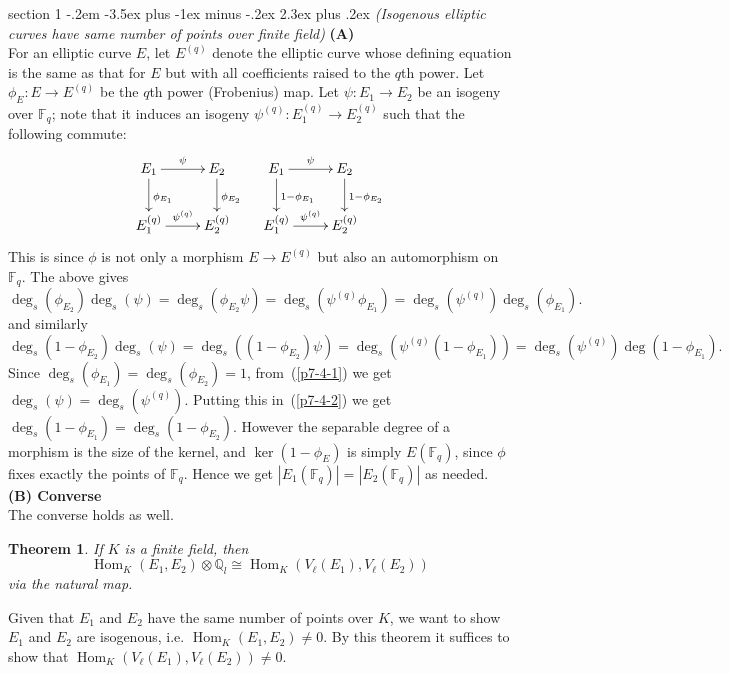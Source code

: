 \documentclass[12pt]{article}
\makeatletter
\theoremstyle{norm}
\newtheorem{thm}{Theorem}[section]
\newcommand{\F}[0]{\mathbb{F}}
\newcommand{\Q}[0]{\mathbb{Q}}
\newcommand{\subprob}[1]{\noindent\textbf{#1}\\}
\newcommand{\Hom}{\operatorname{Hom}}
\newenvironment{problem}{\@startsection
       {section}
       {1}
       {-.2em}
       {-3.5ex plus -1ex minus -.2ex}
       {2.3ex plus .2ex}
       {\pagebreak[3]%
       \large\bf\noindent{Problem }
       }
       }
       {%
       }
\makeatother
\begin{document}
\begin{problem}{\it (Isogenous elliptic curves have same number of points over finite field)}
\subprob{(A)}
For an elliptic curve $E$, let $E^{(q)}$ denote the elliptic curve whose defining equation is the same as that for $E$ but with all coefficients raised to the $q$th power. Let $\phi_E:E\to E^{(q)}$ be the $q$th power (Frobenius) map. Let $\psi:E_1\to E_2$ be an isogeny over $\F_q$; note that it induces an isogeny $\psi^{(q)}:E_1^{(q)}\to E_2^{(q)}$ such that the following commute:
\[
\xymatrix{
E_1\ar[r]^{\psi}\ar[d]^{\phi_{E_1}} &E_2\ar[d]^{\phi_{E_2}}\\
E_1^{(q)}\ar[r]^{\psi^{(q)}}&E_2^{(q)}
}\quad
\xymatrix{
E_1\ar[r]^{\psi}\ar[d]^{1-\phi_{E_1}} &E_2\ar[d]^{1-\phi_{E_2}}\\
E_1^{(q)}\ar[r]^{\psi^{(q)}}&E_2^{(q)}
}
\]
This is since %
$\phi$ is not only a morphism $E\to E^{(q)}$ but also an automorphism on $\F_q$. The above gives
\begin{equation}\label{p7-4-1}
\deg_s(\phi_{E_2})\deg_s(\psi)=\deg_s(\phi_{E_2}\psi)
=\deg_s(\psi^{(q)}\phi_{E_1})=\deg_s(\psi^{(q)})\deg_s(\phi_{E_1}).
\end{equation}
and similarly
\begin{equation}\label{p7-4-2}
\deg_s(1-\phi_{E_2})\deg_s(\psi)=\deg_s((1-\phi_{E_2})\psi)
=\deg_s(\psi^{(q)}(1-\phi_{E_1}))=\deg_s(\psi^{(q)})\deg(1-\phi_{E_1}).
\end{equation}
Since $\deg_s(\phi_{E_1})=\deg_s(\phi_{E_2})=1$, from~(\ref{p7-4-1}) we get $\deg_s(\psi)=\deg_s(\psi^{(q)})$. Putting this in~(\ref{p7-4-2}) we get $\deg_s(1-\phi_{E_1})=\deg_s(1-\phi_{E_2})$. However the separable degree of a morphism is the size of the kernel, and $\ker(1-\phi_E)$ is simply $E(\F_{q})$, since $\phi$ fixes exactly the points of $\F_q$. Hence 
we get 
$|E_1(\F_q)|=|E_2(\F_q)|$ as needed.\\

\subprob{(B) Converse}
The converse holds as well.
\begin{thm}\cite[III.7.7]{silv}
If $K$ is a finite field, then
\[
\Hom_K(E_1,E_2)\otimes \Q_l\cong \Hom_K(V_{\ell}(E_1),V_{\ell}(E_2))
\]
via the natural map.
\end{thm}
Given that $E_1$ and $E_2$ have the same number of points over $K$, we want to show $E_1$ and $E_2$ are isogenous, i.e. $\Hom_K(E_1,E_2)\neq 0$. By this theorem it suffices to show that $\Hom_K(V_{\ell}(E_1),V_{\ell}(E_2))\neq 0$.


\end{problem}
\end{document}
